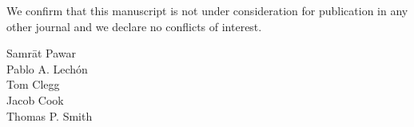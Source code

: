 \documentclass[blank]{impletter}
\begin{document}
We confirm that this manuscript is not under consideration for publication in any other journal and we declare no conflicts of interest. 

{
\vspace{-40pt}

Samr\={a}t Pawar\\
Pablo A. Lech\'{o}n\\
Tom Clegg \\
Jacob Cook \\
Thomas P. Smith
}

{\footnotesize

}
\end{document}
